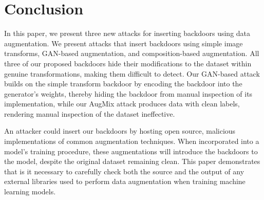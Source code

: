 \section{Conclusion}

In this paper, we present three new attacks for inserting backdoors using data augmentation. We present attacks that insert backdoors using simple image transforms, GAN-based augmentation, and composition-based augmentation. All three of our proposed backdoors hide their modifications to the dataset within genuine transformations, making them difficult to detect. Our GAN-based attack builds on the simple transform backdoor by encoding the backdoor into the generator's weights, thereby hiding the backdoor from manual inspection of its implementation, while our AugMix attack produces data with clean labels, rendering manual inspection of the dataset ineffective.

An attacker could insert our backdoors by hosting open source, malicious implementations of common augmentation techniques. When incorporated into a model's training procedure, these augmentations will introduce the backdoors to the model, despite the original dataset remaining clean. This paper demonstrates that is it necessary to carefully check both the source and the output of any external libraries used to perform data augmentation when training machine learning models.